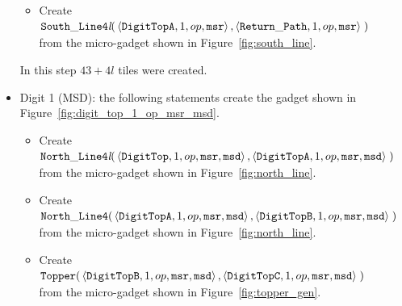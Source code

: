 \begin{itemize}
\begin{itemize}
            \item Create
            $\begin{aligned}[t]
                {\tt South\_Line4\textit{l}}(& \left\langle {\tt DigitTopA}, 1, op, {\tt msr}\right\rangle,
                                               \left\langle {\tt Return\_Path},     1, op, {\tt msr}\right\rangle \;)
            \end{aligned}$ \\ from the micro-gadget shown in Figure~\ref{fig:south_line}.
        \end{itemize}
        In this step $43 + 4l$ tiles were created.
        \vspace{1cm}


        \item Digit 1 (MSD): the following statements create the gadget shown in Figure~\ref{fig:digit_top_1_op_msr_msd}.
        \begin{itemize}
            \item Create
            $\begin{aligned}[t]
                {\tt North\_Line4\textit{l}}(& \left\langle {\tt DigitTop},  1, op, {\tt msr}, {\tt msd}\right\rangle,
                                               \left\langle {\tt DigitTopA}, 1, op, {\tt msr}, {\tt msd}\right\rangle \;)
            \end{aligned}$\\from the micro-gadget shown in Figure~\ref{fig:north_line}.

            \item Create $\begin{aligned}[t]
                {\tt North\_Line4}(& \left\langle {\tt DigitTopA}, 1, op, {\tt msr}, {\tt msd}\right\rangle,
                                     \left\langle {\tt DigitTopB}, 1, op, {\tt msr}, {\tt msd}\right\rangle \;)
            \end{aligned}$\\from the micro-gadget shown in Figure~\ref{fig:north_line}.

            \item Create $\begin{aligned}[t]
                {\tt Topper}(& \left\langle {\tt DigitTopB}, 1, op, {\tt msr}, {\tt msd}\right\rangle,
                               \left\langle {\tt DigitTopC}, 1, op, {\tt msr}, {\tt msd}\right\rangle \;)
            \end{aligned}$\\from the micro-gadget shown in Figure~\ref{fig:topper_gen}.


\end{itemize}
\end{itemize}

